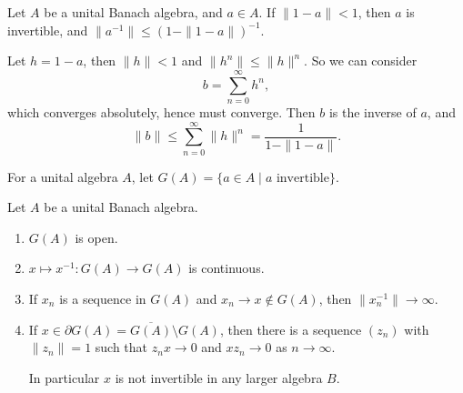 \documentclass[12pt]{article}
\begin{document}
\begin{lemma}
	Let $A$ be a unital Banach algebra, and $a \in A$. If $\|1 - a\| < 1$, then $a$ is invertible, and $\|a^{-1}\| \leq (1 - \|1 - a\|)^{-1}$.
\end{lemma}

\begin{proofbox}
	Let $h = 1 - a$, then $\|h\| < 1$ and $\|h^{n}\| \leq \|h\|^{n}$. So we can consider
	\[
	b = \sum_{n = 0}^{\infty} h^{n},
	\]
	which converges absolutely, hence must converge. Then $b$ is the inverse of $a$, and
	\[
	\|b\| \leq \sum_{n = 0}^{\infty} \|h\|^{n} = \frac{1}{1 - \|1 - a\|}.
	\]
\end{proofbox}

For a unital algebra $A$, let $G(A) = \{a \in A \mid a \text{ invertible}\}$.

\begin{corollary}
	Let $A$ be a unital Banach algebra.
	\begin{enumerate}[\normalfont(i)]
		\item $G(A)$ is open.
		\item $x \mapsto x^{-1} : G(A) \to G(A)$ is continuous.
		\item If $x_n$ is a sequence in $G(A)$ and $x_n \to x \not \in G(A)$, then $\|x_n^{-1}\| \to \infty$.
		\item If $x \in \partial G(A) = \overline{G(A)} \setminus G(A)$, then there is a sequence $(z_n)$ with $\|z_n\| = 1$ such that $z_n x \to 0$ and $x z_n \to 0$ as $n \to \infty$.

			In particular $x$ is not invertible in any larger algebra $B$.
	\end{enumerate}
\end{corollary}
\end{document}
